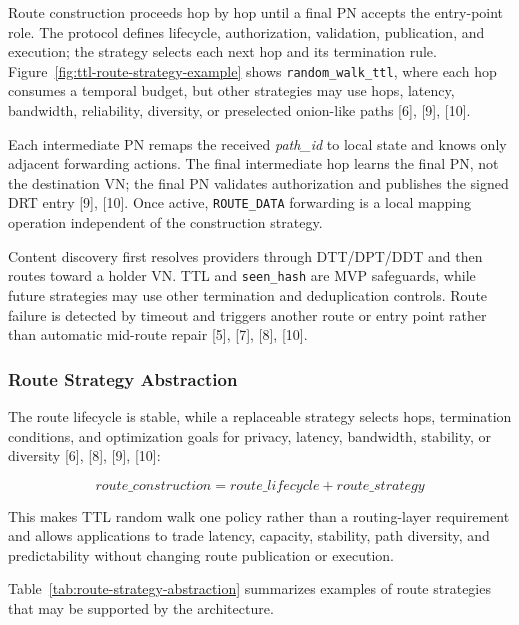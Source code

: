 \documentclass[12pt,a4paper]{article}
\begin{document}
\thesisroutestrategyconstructiontikz

\thesishopbyhoptikz

Route construction proceeds hop by hop until a final PN accepts the entry-point role. The protocol defines lifecycle, authorization, validation, publication, and execution; the strategy selects each next hop and its termination rule. Figure~\ref{fig:ttl-route-strategy-example} shows \texttt{random\_walk\_ttl}, where each hop consumes a temporal budget, but other strategies may use hops, latency, bandwidth, reliability, diversity, or preselected onion-like paths [6], [9], [10].

Each intermediate PN remaps the received \textit{path\_id} to local state and knows only adjacent forwarding actions. The final intermediate hop learns the final PN, not the destination VN; the final PN validates authorization and publishes the signed DRT entry [9], [10]. Once active, \texttt{ROUTE\_DATA} forwarding is a local mapping operation independent of the construction strategy.

Content discovery first resolves providers through DTT/DPT/DDT and then routes toward a holder VN. TTL and \texttt{seen\_hash} are MVP safeguards, while future strategies may use other termination and deduplication controls. Route failure is detected by timeout and triggers another route or entry point rather than automatic mid-route repair [5], [7], [8], [10].

\subsubsection{Route Strategy Abstraction}
\label{subsubsec:route-strategy-abstraction}

The route lifecycle is stable, while a replaceable strategy selects hops, termination conditions, and optimization goals for privacy, latency, bandwidth, stability, or diversity [6], [8], [9], [10]:

\[
route\_construction = route\_lifecycle + route\_strategy
\]

This makes TTL random walk one policy rather than a routing-layer requirement and allows applications to trade latency, capacity, stability, path diversity, and predictability without changing route publication or execution.

Table~\ref{tab:route-strategy-abstraction} summarizes examples of route strategies
that may be supported by the architecture.
\end{document}
